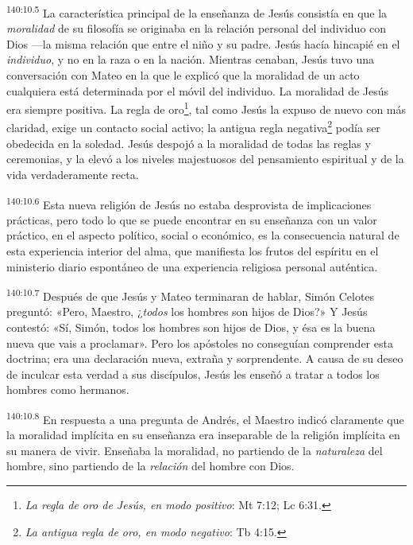 \par 
\textsuperscript{140:10.5} La característica principal de la enseñanza de Jesús consistía en que la \textit{moralidad} de su filosofía se originaba en la relación personal del individuo con Dios ---la misma relación que entre el niño y su padre. Jesús hacía hincapié en el \textit{individuo}, y no en la raza o en la nación. Mientras cenaban, Jesús tuvo una conversación con Mateo en la que le explicó que la moralidad de un acto cualquiera está determinada por el móvil del individuo. La moralidad de Jesús era siempre positiva. La regla de oro\footnote{\textit{La regla de oro de Jesús, en modo positivo}: Mt 7:12; Lc 6:31.}, tal como Jesús la expuso de nuevo con más claridad, exige un contacto social activo; la antigua regla negativa\footnote{\textit{La antigua regla de oro, en modo negativo}: Tb 4:15.} podía ser obedecida en la soledad. Jesús despojó a la moralidad de todas las reglas y ceremonias, y la elevó a los niveles majestuosos del pensamiento espiritual y de la vida verdaderamente recta.

\par 
\textsuperscript{140:10.6} Esta nueva religión de Jesús no estaba desprovista de implicaciones prácticas, pero todo lo que se puede encontrar en su enseñanza con un valor práctico, en el aspecto político, social o económico, es la consecuencia natural de esta experiencia interior del alma, que manifiesta los frutos del espíritu en el ministerio diario espontáneo de una experiencia religiosa personal auténtica.

\par 
\textsuperscript{140:10.7} Después de que Jesús y Mateo terminaran de hablar, Simón Celotes preguntó: «Pero, Maestro, ¿\textit{todos} los hombres son hijos de Dios?» Y Jesús contestó: «Sí, Simón, todos los hombres son hijos de Dios, y ésa es la buena nueva que vais a proclamar». Pero los apóstoles no conseguían comprender esta doctrina; era una declaración nueva, extraña y sorprendente. A causa de su deseo de inculcar esta verdad a sus discípulos, Jesús les enseñó a tratar a todos los hombres como hermanos.

\par 
\textsuperscript{140:10.8} En respuesta a una pregunta de Andrés, el Maestro indicó claramente que la moralidad implícita en su enseñanza era inseparable de la religión implícita en su manera de vivir. Enseñaba la moralidad, no partiendo de la \textit{naturaleza} del hombre, sino partiendo de la \textit{relación} del hombre con Dios.

